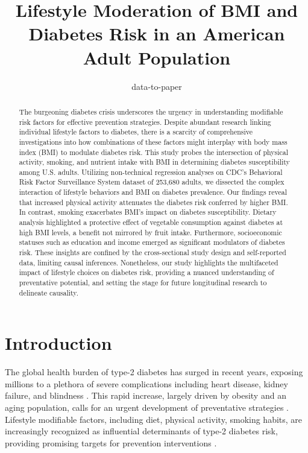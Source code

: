 \documentclass[11pt]{article}
\title{Lifestyle Moderation of BMI and Diabetes Risk in an American Adult Population}
\author{data-to-paper}
\begin{document}
\maketitle
\begin{abstract}
The burgeoning diabetes crisis underscores the urgency in understanding modifiable risk factors for effective prevention strategies. Despite abundant research linking individual lifestyle factors to diabetes, there is a scarcity of comprehensive investigations into how combinations of these factors might interplay with body mass index (BMI) to modulate diabetes risk. This study probes the intersection of physical activity, smoking, and nutrient intake with BMI in determining diabetes susceptibility among U.S. adults. Utilizing non-technical regression analyses on CDC's Behavioral Risk Factor Surveillance System dataset of 253,680 adults, we dissected the complex interaction of lifestyle behaviors and BMI on diabetes prevalence. Our findings reveal that increased physical activity attenuates the diabetes risk conferred by higher BMI. In contrast, smoking exacerbates BMI's impact on diabetes susceptibility. Dietary analysis highlighted a protective effect of vegetable consumption against diabetes at high BMI levels, a benefit not mirrored by fruit intake. Furthermore, socioeconomic statuses such as education and income emerged as significant modulators of diabetes risk. These insights are confined by the cross-sectional study design and self-reported data, limiting causal inferences. Nonetheless, our study highlights the multifaceted impact of lifestyle choices on diabetes risk, providing a nuanced understanding of preventative potential, and setting the stage for future longitudinal research to delineate causality.
\end{abstract}
\section*{Introduction}

The global health burden of type-2 diabetes has surged in recent years, exposing millions to a plethora of severe complications including heart disease, kidney failure, and blindness \cite{Chiu2011DerivingEB, Chan1994ObesityFD, Pi-Sunyer2007ReductionIW}. This rapid increase, largely driven by obesity and an aging population, calls for an urgent development of preventative strategies \cite{Chan1994ObesityFD, Wing2011BenefitsOM}. Lifestyle modifiable factors, including diet, physical activity, smoking habits, are increasingly recognized as influential determinants of type-2 diabetes risk, providing promising targets for prevention interventions \cite{Reis2011LifestyleFA, Oort2020AssociationOC}. 
\end{document}
